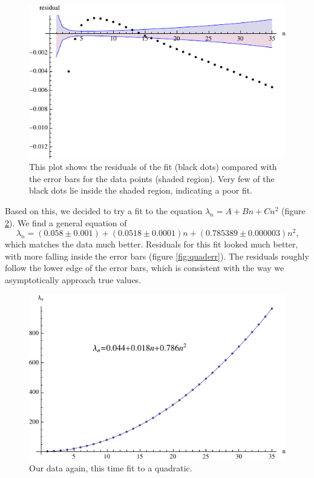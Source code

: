 \documentclass[12pt,twoside]{reedthesis}
\newcommand{\eqn}[1]{\begin{equation}#1\end{equation}}
\begin{document}
\begin{figure}[h]
\centering
\includegraphics{Figures/logerr}
\caption[Residuals of log-log fit]{This plot shows the residuals of the fit (black dots) compared with the error bars for the data points (shaded region). Very few of the black dots lie inside the shaded region, indicating a poor fit.}
\label{fig:logerr}
\end{figure}
Based on this, we decided to try a fit to the equation $\lambda_n = A + B n + C n^2$ (figure \ref{fig:quadfit}). We find a general equation of 
\eqn{
\lambda_n = (0.058 \pm 0.001) + (0.0518 \pm 0.0001) n + ( 0.785389 \pm 0.000003) n^2\mbox{,}
}
which matches the data much better. Residuals for this fit looked much better, with more falling inside the error bars (figure \ref{fig:quaderr}). The residuals roughly follow the lower edge of the error bars, which is consistent with the way we asymptotically approach true values.
\begin{figure}[h]
\centering
\includegraphics{Figures/quadfit}
\caption[Quadratic fit]{Our data again, this time fit to a quadratic.}
\label{fig:quadfit}
\end{figure}
\end{document}
